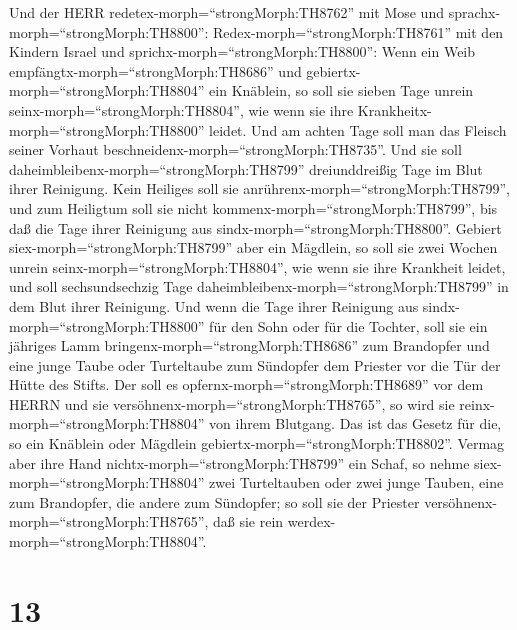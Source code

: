  Und der HERR redetex-morph=``strongMorph:TH8762'' mit Mose
und sprachx-morph=``strongMorph:TH8800'': 
Redex-morph=``strongMorph:TH8761'' mit den Kindern Israel und
sprichx-morph=``strongMorph:TH8800'': Wenn ein Weib
empfängtx-morph=``strongMorph:TH8686'' und
gebiertx-morph=``strongMorph:TH8804'' ein Knäblein, so soll sie sieben
Tage unrein seinx-morph=``strongMorph:TH8804'', wie wenn sie ihre
Krankheitx-morph=``strongMorph:TH8800'' leidet.  Und am
achten Tage soll man das Fleisch seiner Vorhaut
beschneidenx-morph=``strongMorph:TH8735''.  Und sie soll
daheimbleibenx-morph=``strongMorph:TH8799'' dreiunddreißig Tage im Blut
ihrer Reinigung. Kein Heiliges soll sie
anrührenx-morph=``strongMorph:TH8799'', und zum Heiligtum soll sie nicht
kommenx-morph=``strongMorph:TH8799'', bis daß die Tage ihrer Reinigung
aus sindx-morph=``strongMorph:TH8800''.  Gebiert
siex-morph=``strongMorph:TH8799'' aber ein Mägdlein, so soll sie zwei
Wochen unrein seinx-morph=``strongMorph:TH8804'', wie wenn sie ihre
Krankheit leidet, und soll sechsundsechzig Tage
daheimbleibenx-morph=``strongMorph:TH8799'' in dem Blut ihrer Reinigung.
 Und wenn die Tage ihrer Reinigung aus
sindx-morph=``strongMorph:TH8800'' für den Sohn oder für die Tochter,
soll sie ein jähriges Lamm bringenx-morph=``strongMorph:TH8686'' zum
Brandopfer und eine junge Taube oder Turteltaube zum Sündopfer dem
Priester vor die Tür der Hütte des Stifts.  Der soll es
opfernx-morph=``strongMorph:TH8689'' vor dem HERRN und sie
versöhnenx-morph=``strongMorph:TH8765'', so wird sie
reinx-morph=``strongMorph:TH8804'' von ihrem Blutgang. Das ist das
Gesetz für die, so ein Knäblein oder Mägdlein
gebiertx-morph=``strongMorph:TH8802''.  Vermag aber ihre
Hand nichtx-morph=``strongMorph:TH8799'' ein Schaf, so nehme
siex-morph=``strongMorph:TH8804'' zwei Turteltauben oder zwei junge
Tauben, eine zum Brandopfer, die andere zum Sündopfer; so soll sie der
Priester versöhnenx-morph=``strongMorph:TH8765'', daß sie rein
werdex-morph=``strongMorph:TH8804''.

\hypertarget{section-12}{%
\section{13}\label{section-12}}

